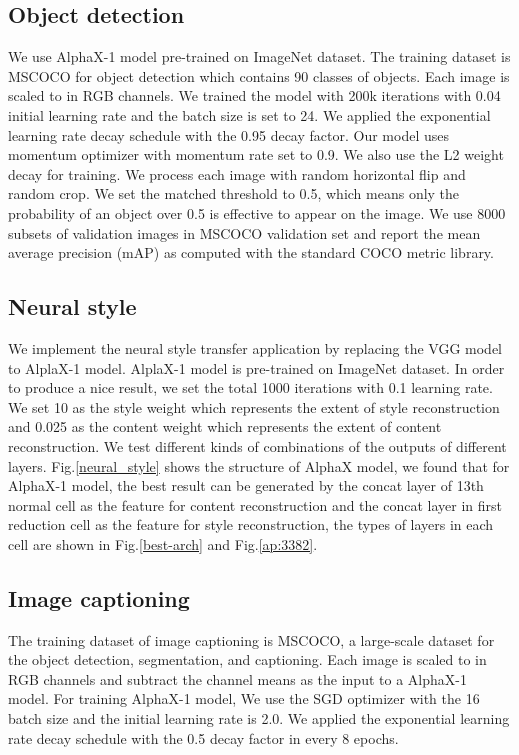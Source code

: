 \documentclass[10pt,twocolumn,letterpaper]{article}
\begin{document}
\label{ap:setup_vision_models}
\subsection{Object detection}
We use AlphaX-1 model pre-trained on ImageNet dataset. The training dataset is MSCOCO for object detection\cite{LinMBHPRDZ14} which contains 90 classes of objects. Each image is scaled to  in RGB channels. We trained the model with 200k iterations with 0.04 initial learning rate and the batch size is set to 24. We applied the exponential learning rate decay schedule with the 0.95 decay factor. Our model uses momentum optimizer with momentum rate set to 0.9. We also use the L2 weight decay for training. We process each image with random horizontal flip and random crop\cite{liu2016ssd}. We set the matched threshold to 0.5, which means only the probability of an object over 0.5 is effective to appear on the image. We use 8000 subsets of validation images in MSCOCO validation set and report the mean average precision (mAP) as computed with the standard COCO metric library\cite{MSCOCO2014}. 

\subsection{Neural style}
We implement the neural style transfer application by replacing the VGG model to AlplaX-1 model\cite{neural_style}. AlplaX-1 model is pre-trained on ImageNet dataset. In order to produce a nice result, we set the total 1000 iterations with 0.1 learning rate. We set 10 as the style weight which represents the extent of style reconstruction and 0.025 as the content weight which represents the extent of content reconstruction. We test different kinds of combinations of the outputs of different layers. Fig.\ref{neural_style} shows the structure of AlphaX model, we found that for AlphaX-1 model, the best result can be generated by the concat layer of 13th normal cell as the feature for content reconstruction and the concat layer in first reduction cell as the feature for style reconstruction, the types of layers in each cell are shown in Fig.\ref{best-arch} and Fig.\ref{ap:3382}.

\subsection{Image captioning}
The training dataset of image captioning is MSCOCO\cite{LinMBHPRDZ14}, a large-scale dataset for the object detection, segmentation, and captioning. Each image is scaled to  in RGB channels and subtract the channel means as the input to a AlphaX-1 model. For training AlphaX-1 model, We use the SGD optimizer with the 16 batch size and the initial learning rate is 2.0. We applied the exponential learning rate decay schedule with the 0.5 decay factor in every 8 epochs.  
\end{document}
